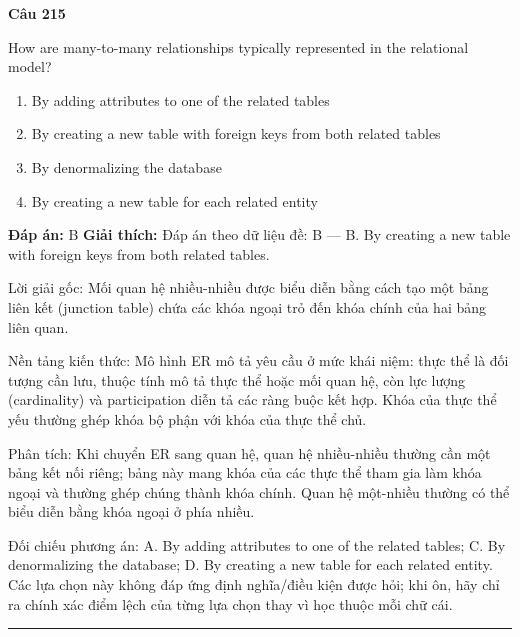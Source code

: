 \documentclass[11pt,a4paper]{article}
\newenvironment{question}[1]{%
  \par\vspace{1em}\noindent\textbf{\large Câu #1}\par\vspace{0.4em}
}{%
  \par\vspace{1em}\hrule\vspace{0.6em}
}
\newenvironment{choices}{%
  \begin{enumerate}[label=\textbf{\Alph*.},leftmargin=2.2em,itemsep=2pt,topsep=3pt]
}{%
  \end{enumerate}
}
\newcommand{\choice}{\item}
\begin{document}
\begin{question}{215}
How are many-to-many relationships typically represented in the relational model?
\begin{choices}
\choice By adding attributes to one of the related tables
\choice By creating a new table with foreign keys from both related tables
\choice By denormalizing the database
\choice By creating a new table for each related entity
\end{choices}
\textbf{Đáp án:} B
\textbf{Giải thích:} Đáp án theo dữ liệu đề: B — B. By creating a new table with foreign keys from both related tables.

Lời giải gốc: Mối quan hệ nhiều-nhiều được biểu diễn bằng cách tạo một bảng liên kết (junction table) chứa các khóa ngoại trỏ đến khóa chính của hai bảng liên quan.

Nền tảng kiến thức: Mô hình ER mô tả yêu cầu ở mức khái niệm: thực thể là đối tượng cần lưu, thuộc tính mô tả thực thể hoặc mối quan hệ, còn lực lượng (cardinality) và participation diễn tả các ràng buộc kết hợp. Khóa của thực thể yếu thường ghép khóa bộ phận với khóa của thực thể chủ.

Phân tích: Khi chuyển ER sang quan hệ, quan hệ nhiều-nhiều thường cần một bảng kết nối riêng; bảng này mang khóa của các thực thể tham gia làm khóa ngoại và thường ghép chúng thành khóa chính. Quan hệ một-nhiều thường có thể biểu diễn bằng khóa ngoại ở phía nhiều.

Đối chiếu phương án: A. By adding attributes to one of the related tables; C. By denormalizing the database; D. By creating a new table for each related entity. Các lựa chọn này không đáp ứng định nghĩa/điều kiện được hỏi; khi ôn, hãy chỉ ra chính xác điểm lệch của từng lựa chọn thay vì học thuộc mỗi chữ cái.
\end{question}
\end{document}
